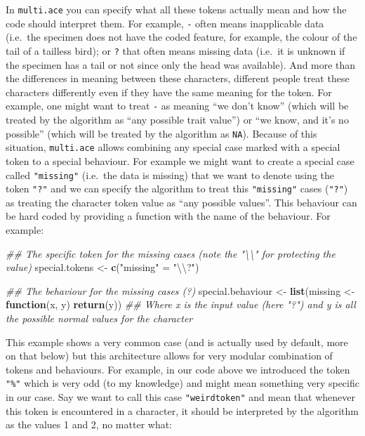 \documentclass[
]{book}
\newenvironment{Shaded}{\begin{snugshade}}{\end{snugshade}}
\newcommand{\CharTok}[1]{\textcolor[rgb]{0.31,0.60,0.02}{#1}}
\newcommand{\CommentTok}[1]{\textcolor[rgb]{0.56,0.35,0.01}{\textit{#1}}}
\newcommand{\ControlFlowTok}[1]{\textcolor[rgb]{0.13,0.29,0.53}{\textbf{#1}}}
\newcommand{\KeywordTok}[1]{\textcolor[rgb]{0.13,0.29,0.53}{\textbf{#1}}}
\newcommand{\NormalTok}[1]{#1}
\newcommand{\StringTok}[1]{\textcolor[rgb]{0.31,0.60,0.02}{#1}}
\begin{document}
In \texttt{multi.ace} you can specify what all these tokens actually mean and how the code should interpret them.
For example, \texttt{-} often means inapplicable data (i.e.~the specimen does not have the coded feature, for example, the colour of the tail of a tailless bird); or \texttt{?} that often means missing data (i.e.~it is unknown if the specimen has a tail or not since only the head was available).
And more than the differences in meaning between these characters, different people treat these characters differently even if they have the same meaning for the token.
For example, one might want to treat \texttt{-} as meaning ``we don't know'' (which will be treated by the algorithm as ``any possible trait value'') or ``we know, and it's no possible'' (which will be treated by the algorithm as \texttt{NA}).
Because of this situation, \texttt{multi.ace} allows combining any special case marked with a special token to a special behaviour.
For example we might want to create a special case called \texttt{"missing"} (i.e.~the data is missing) that we want to denote using the token \texttt{"?"} and we can specify the algorithm to treat this \texttt{"missing"} cases (\texttt{"?"}) as treating the character token value as ``any possible values''.
This behaviour can be hard coded by providing a function with the name of the behaviour.
For example:

\begin{Shaded}
\begin{Highlighting}[]
\CommentTok{\#\# The specific token for the missing cases (note the "\textbackslash{}\textbackslash{}" for protecting the value)}
\NormalTok{special.tokens \textless{}{-}}\StringTok{ }\KeywordTok{c}\NormalTok{(}\StringTok{"missing"}\NormalTok{ =}\StringTok{ "}\CharTok{\textbackslash{}\textbackslash{}}\StringTok{?"}\NormalTok{)}

\CommentTok{\#\# The behaviour for the missing cases (?)}
\NormalTok{special.behaviour \textless{}{-}}\StringTok{ }\KeywordTok{list}\NormalTok{(missing \textless{}{-}}\StringTok{ }\ControlFlowTok{function}\NormalTok{(x, y) }\KeywordTok{return}\NormalTok{(y))}
\CommentTok{\#\# Where x is the input value (here "?") and y is all the possible normal values for the character}
\end{Highlighting}
\end{Shaded}

This example shows a very common case (and is actually used by default, more on that below) but this architecture allows for very modular combination of tokens and behaviours.
For example, in our code above we introduced the token \texttt{"\%"} which is very odd (to my knowledge) and might mean something very specific in our case.
Say we want to call this case \texttt{"weirdtoken"} and mean that whenever this token is encountered in a character, it should be interpreted by the algorithm as the values 1 and 2, no matter what:
\end{document}
